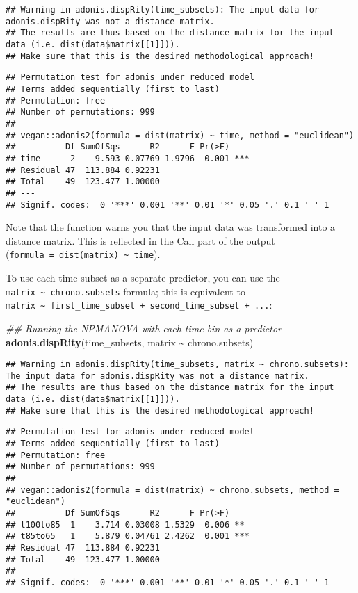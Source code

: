 \documentclass[
]{book}
\newenvironment{Shaded}{\begin{snugshade}}{\end{snugshade}}
\newcommand{\CommentTok}[1]{\textcolor[rgb]{0.56,0.35,0.01}{\textit{#1}}}
\newcommand{\KeywordTok}[1]{\textcolor[rgb]{0.13,0.29,0.53}{\textbf{#1}}}
\newcommand{\NormalTok}[1]{#1}
\newcommand{\OperatorTok}[1]{\textcolor[rgb]{0.81,0.36,0.00}{\textbf{#1}}}
\newcommand{\StringTok}[1]{\textcolor[rgb]{0.31,0.60,0.02}{#1}}
\begin{document}
\begin{verbatim}
## Warning in adonis.dispRity(time_subsets): The input data for adonis.dispRity was not a distance matrix.
## The results are thus based on the distance matrix for the input data (i.e. dist(data$matrix[[1]])).
## Make sure that this is the desired methodological approach!
\end{verbatim}

\begin{verbatim}
## Permutation test for adonis under reduced model
## Terms added sequentially (first to last)
## Permutation: free
## Number of permutations: 999
## 
## vegan::adonis2(formula = dist(matrix) ~ time, method = "euclidean")
##          Df SumOfSqs      R2      F Pr(>F)    
## time      2    9.593 0.07769 1.9796  0.001 ***
## Residual 47  113.884 0.92231                  
## Total    49  123.477 1.00000                  
## ---
## Signif. codes:  0 '***' 0.001 '**' 0.01 '*' 0.05 '.' 0.1 ' ' 1
\end{verbatim}

Note that the function warns you that the input data was transformed into a distance matrix.
This is reflected in the Call part of the output (\texttt{formula\ =\ dist(matrix)\ \textasciitilde{}\ time}).

To use each time subset as a separate predictor, you can use the \texttt{matrix\ \textasciitilde{}\ chrono.subsets} formula; this is equivalent to \texttt{matrix\ \textasciitilde{}\ first\_time\_subset\ +\ second\_time\_subset\ +\ ...}:

\begin{Shaded}
\begin{Highlighting}[]
\CommentTok{\#\# Running the NPMANOVA with each time bin as a predictor}
\KeywordTok{adonis.dispRity}\NormalTok{(time\_subsets, matrix }\OperatorTok{\textasciitilde{}}\StringTok{ }\NormalTok{chrono.subsets)}
\end{Highlighting}
\end{Shaded}

\begin{verbatim}
## Warning in adonis.dispRity(time_subsets, matrix ~ chrono.subsets): The input data for adonis.dispRity was not a distance matrix.
## The results are thus based on the distance matrix for the input data (i.e. dist(data$matrix[[1]])).
## Make sure that this is the desired methodological approach!
\end{verbatim}

\begin{verbatim}
## Permutation test for adonis under reduced model
## Terms added sequentially (first to last)
## Permutation: free
## Number of permutations: 999
## 
## vegan::adonis2(formula = dist(matrix) ~ chrono.subsets, method = "euclidean")
##          Df SumOfSqs      R2      F Pr(>F)    
## t100to85  1    3.714 0.03008 1.5329  0.006 ** 
## t85to65   1    5.879 0.04761 2.4262  0.001 ***
## Residual 47  113.884 0.92231                  
## Total    49  123.477 1.00000                  
## ---
## Signif. codes:  0 '***' 0.001 '**' 0.01 '*' 0.05 '.' 0.1 ' ' 1
\end{verbatim}
\end{document}
